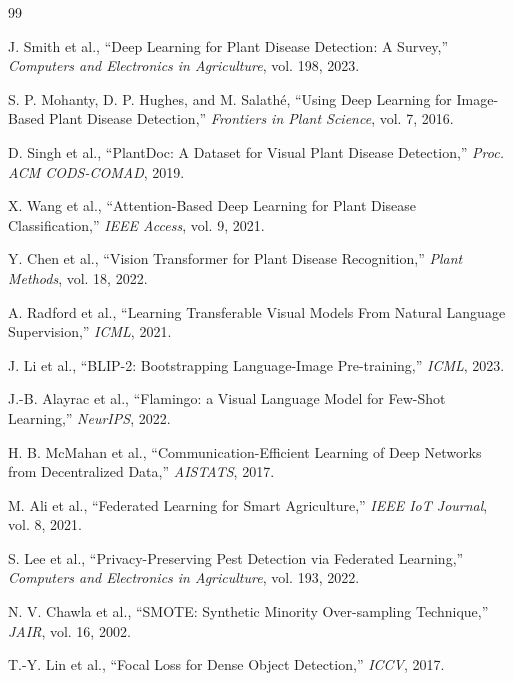 \documentclass[journal]{IEEEtran}
\begin{document}
\begin{thebibliography}{99}

J. Smith et al., ``Deep Learning for Plant Disease Detection: A Survey,'' \textit{Computers and Electronics in Agriculture}, vol. 198, 2023.

S. P. Mohanty, D. P. Hughes, and M. Salath\'{e}, ``Using Deep Learning for Image-Based Plant Disease Detection,'' \textit{Frontiers in Plant Science}, vol. 7, 2016.

D. Singh et al., ``PlantDoc: A Dataset for Visual Plant Disease Detection,'' \textit{Proc. ACM CODS-COMAD}, 2019.

X. Wang et al., ``Attention-Based Deep Learning for Plant Disease Classification,'' \textit{IEEE Access}, vol. 9, 2021.

Y. Chen et al., ``Vision Transformer for Plant Disease Recognition,'' \textit{Plant Methods}, vol. 18, 2022.

A. Radford et al., ``Learning Transferable Visual Models From Natural Language Supervision,'' \textit{ICML}, 2021.

J. Li et al., ``BLIP-2: Bootstrapping Language-Image Pre-training,'' \textit{ICML}, 2023.

J.-B. Alayrac et al., ``Flamingo: a Visual Language Model for Few-Shot Learning,'' \textit{NeurIPS}, 2022.

H. B. McMahan et al., ``Communication-Efficient Learning of Deep Networks from Decentralized Data,'' \textit{AISTATS}, 2017.

M. Ali et al., ``Federated Learning for Smart Agriculture,'' \textit{IEEE IoT Journal}, vol. 8, 2021.

S. Lee et al., ``Privacy-Preserving Pest Detection via Federated Learning,'' \textit{Computers and Electronics in Agriculture}, vol. 193, 2022.

N. V. Chawla et al., ``SMOTE: Synthetic Minority Over-sampling Technique,'' \textit{JAIR}, vol. 16, 2002.

T.-Y. Lin et al., ``Focal Loss for Dense Object Detection,'' \textit{ICCV}, 2017.

\end{thebibliography}
\end{document}
